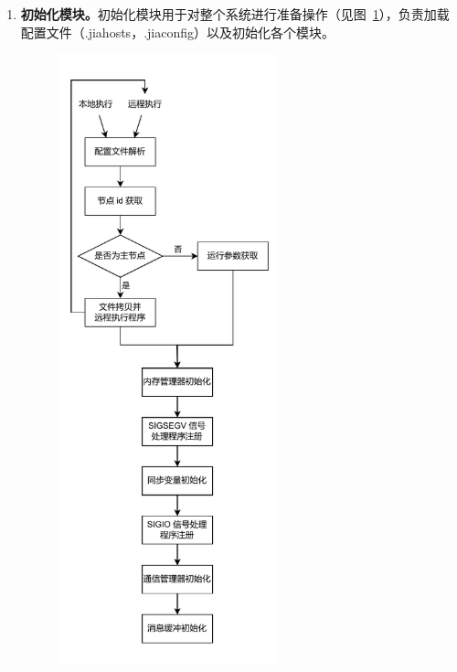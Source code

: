 {    \begin{enumerate}[label=\arabic*.]
        \item \textbf{初始化模块。}初始化模块用于对整个系统进行准备操作（见图~\ref{fig:JIAJIA-init}），负责加载配置文件（.jiahosts，.jiaconfig）以及初始化各个模块。
              \begin{figure}[!htbp]
                  \centering
                  \includegraphics[width=0.6\textwidth]{Img/JIAJIA初始化模块.drawio.pdf}
                  \label{fig:JIAJIA-init}
              \end{figure}


\end{enumerate}}
